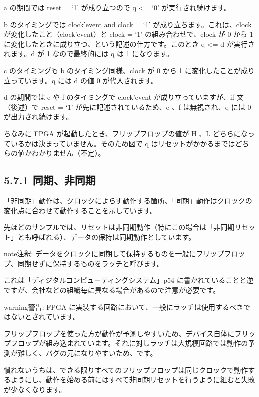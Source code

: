 \documentclass[letterpaper,10pt,dvipdfmx]{sphinxmanual}
\begin{document}
a の期間では reset = `1' が成り立つので q \textless{}= `0' が実行され続けます。

b のタイミングでは clock'event and clock = `1' が成り立ちます。これは、clock が変化したこと（clock'event）と clock = `1' の組み合わせで、clock が 0 から 1 に変化したときに成り立つ、という記述の仕方です。このとき q \textless{}= d が実行されます。d が 1 なので最終的には q は 1 になります。

c のタイミングも b のタイミング同様、clock が 0 から 1 に変化したことが成り立っています。q には d の値 0 が代入されます。

d の期間では e や f のタイミングで clock'event が成り立っていますが、if 文（後述）で reset = `1' が先に記述されているため、e 、f は無視され、q には 0 が出力され続けます。

ちなみに FPGA が起動したとき、フリップフロップの値が H 、L どちらになっているかは決まっていません。そのため図で q はリセットがかかるまではどちらの値かわかりません（不定）。


\subsection{5.7.1 同期、非同期}
\label{05_try:id9}
「非同期」動作は、クロックによらず動作する箇所、「同期」動作はクロックの変化点に合わせて動作することを示しています。

先ほどのサンプルでは、リセットは非同期動作（特にこの場合は「非同期リセット」とも呼ばれる）、データの保持は同期動作としています。

\begin{notice}{note}{注釈:}
データをクロックに同期して保持するものを一般にフリップフロップ、同期せずに保持するものをラッチと呼びます。

これは「ディジタルコンピューティングシステム」p54 に書かれていることと逆ですが、会社などの組織毎に異なる場合があるので注意が必要です。
\end{notice}

\begin{notice}{warning}{警告:}
FPGA に実装する回路において、一般にラッチは使用するべきではないとされています。

フリップフロップを使った方が動作が予測しやすいため、デバイス自体にフリップフロップが組み込まれています。それに対しラッチは大規模回路では動作の予測が難しく、バグの元になりやすいため、です。

慣れないうちは、できる限りすべてのフリップフロップは同じクロックで動作するようにし、動作を始める前にはすべて非同期リセットを行うように組むと失敗が少なくなります。
\end{notice}
\end{document}
